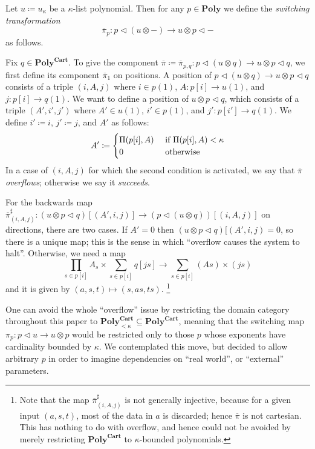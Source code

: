 \documentclass[11pt, one side, article]{memoir}
\theoremstyle{definition}
\theoremstyle{plain}
\newenvironment{definition}
  {\pushQED{\qed}\renewcommand{\qedsymbol}{$\lozenge$}\definitionx}
  {\popQED\enddefinitionx}
\renewcommand{\ss}{\subseteq}
\newcommand{\Cat}[1]{\mathbf{#1}}%
\newcommand{\tn}[1]{\textnormal{#1}}
\newcommand{\ol}[1]{\overline{#1}}
\newcommand{\poly}{\Cat{Poly}}
\newcommand{\polycart}{\poly^{\Cat{Cart}}}
\newcommand{\0}{\textsf{0}}
\newcommand{\1}{\tn{\textsf{1}}}
\newcommand{\tri}{\mathbin{\triangleleft}}
\newcommand{\switch}{\pi}
\begin{document}
\begin{definition}[Switching transformation $\ol{\switch}$]\label{def.switching}
Let $u\coloneqq u_\kappa$ be a $\kappa$-list polynomial. Then for any $p\in\poly$ we define the \emph{switching transformation}
\[\ol{\switch}_{p}\colon p\tri(u\otimes -)\to u\otimes p\tri -\]
as follows.

Fix $q\in\polycart$. To give the component $\ol{\switch}\coloneqq\ol{\switch}_{p,q}\colon p\tri(u\otimes q)\to u\otimes p\tri q$, we first define its component $\ol{\switch}_1$ on positions. A position of $p\tri(u\otimes q)\to u\otimes p\tri q$ consists of a triple $(i,A,j)$ where $i\in p(1)$, $A\colon p[i]\to u(1)$, and $j\colon p[i]\to q(1)$. We want to define a position of $u\otimes p\tri q$, which consists of a triple $(A',i',j')$ where $A'\in u(1)$, $i'\in p(1)$, and $j'\colon p[i']\to q(1)$. We define $i'\coloneqq i$, $j'\coloneqq j$, and $A'$ as follows:
\begin{equation}\label{eqn.overflow}
  A'\coloneqq
  \begin{cases}
  	\Pi(p[i],A)&\tn{ if }\Pi(p[i],A)<\kappa\\
		0&\tn{ otherwise}
  \end{cases}
\end{equation}
In a case of $(i,A,j)$ for which the second condition is activated, we say that $\ol{\switch}$ \emph{overflows}; otherwise we say it \emph{succeeds}.

For the backwards map $\ol{\switch}^\sharp_{(i,A,j)}\colon (u\otimes p\tri q)[(A',i,j)]\to(p\tri(u\otimes q))[(i,A,j)]$ on directions, there are two cases. If $A'=0$ then $(u\otimes p\tri q)[(A',i,j)=0$, so there is a unique map; this is the sense in which ``overflow causes the system to halt''. Otherwise, we need a map
\begin{equation}\label{eqn.not_injective}
\prod_{s\in p[i]}A_s\times\sum_{s\in p[i]}q[js]\to\sum_{s\in p[i]}(A s)\times (js)
\end{equation}
and it is given by $(a,s,t)\mapsto(s,as,ts)$.%
\footnote{Note that the map $\ol{\switch}^\sharp_{(i,A,j)}$ is not generally injective, because for a given input $(a,s,t)$, most of the data in $a$ is discarded; hence $\ol{\switch}$ is not cartesian. This has nothing to do with overflow, and hence could not be avoided by merely restricting $\polycart$ to $\kappa$-bounded polynomials.}
\end{definition}

One can avoid the whole ``overflow'' issue by restricting the domain category throughout this paper to $\polycart_{<\kappa}\ss\polycart$, meaning that the switching map $\switch_p\colon p\tri u\to u\otimes p$ would be restricted only to those $p$ whose exponents have cardinality bounded by $\kappa$. We contemplated this move, but decided to allow arbitrary $p$ in order to imagine dependencies on ``real world'', or ``external'' parameters.
\end{document}
